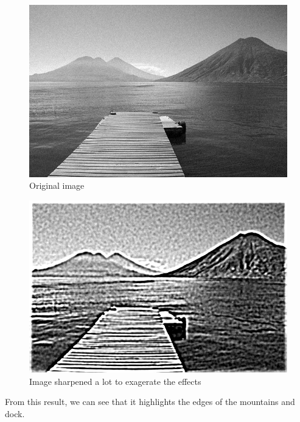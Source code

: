 \documentclass[11pt]{article}
\begin{document}
\begin{FIGURE}
\begin{figure}[H]
\centering
\includegraphics[width=.9\linewidth]{ENG204-Assignment-3-Original.png}
\caption{Original image}
\end{figure}
\end{FIGURE}
\begin{FIGURE}
\begin{figure}[H]
\centering
\includegraphics[width=.9\linewidth]{ENG204-Assignment-3-Sharpened.png}
\caption{Image sharpened a lot to exagerate the effects}
\end{figure}
\end{FIGURE}
From this result, we can see that it highlights the edges of the mountains and dock.
\end{document}
